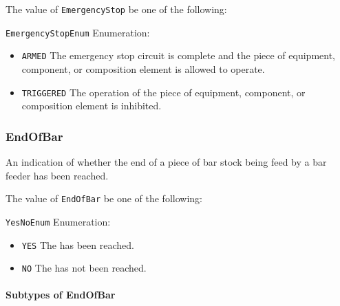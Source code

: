 The value of \texttt{EmergencyStop} \MUST be one of the following: 


\texttt{EmergencyStopEnum} Enumeration:

\begin{itemize}
\item \texttt{ARMED} \newline The emergency stop circuit is complete and the piece of equipment, component, or composition element is allowed to operate.  
\item \texttt{TRIGGERED} \newline The operation of the piece of equipment, component, or composition element is inhibited. 
\end{itemize}

\FloatBarrier

\subsubsection{EndOfBar}




An indication of whether the end of a piece of bar stock being feed by a bar feeder has been reached.


The value of \texttt{EndOfBar} \MUST be one of the following: 


\texttt{YesNoEnum} Enumeration:

\begin{itemize}
\item \texttt{YES} \newline The  has been reached. 
\item \texttt{NO} \newline The  has not been reached. 
\end{itemize}

\FloatBarrier

\paragraph{Subtypes of EndOfBar}\mbox{}
\label{sec:Subtypes of EndOfBar}

